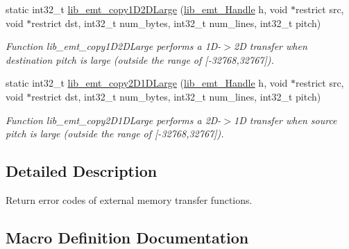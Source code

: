 \begin{DoxyCompactItemize}
static int32\+\_\+t \hyperlink{group__libarch__memtrans_ga1a987a6a5bddf31afc70ce6a0fbd17e1}{lib\+\_\+emt\+\_\+copy1\+D2\+D\+Large} (\hyperlink{group__libarch__memtrans_ga3ee110c7c5d95cfe386b113d2d078ec3}{lib\+\_\+emt\+\_\+\+Handle} h, void $\ast$restrict src, void $\ast$restrict dst, int32\+\_\+t num\+\_\+bytes, int32\+\_\+t num\+\_\+lines, int32\+\_\+t pitch)
\begin{DoxyCompactList}\small\item\em Function lib\+\_\+emt\+\_\+copy1\+D2\+D\+Large performs a 1\+D-\/$>$2\+D transfer when destination pitch is large (outside the range of \mbox{[}-\/32768,32767\mbox{]}). \end{DoxyCompactList}\item 
static int32\+\_\+t \hyperlink{group__libarch__memtrans_gab1b291a6ce214301ed50b5731590e29a}{lib\+\_\+emt\+\_\+copy2\+D1\+D\+Large} (\hyperlink{group__libarch__memtrans_ga3ee110c7c5d95cfe386b113d2d078ec3}{lib\+\_\+emt\+\_\+\+Handle} h, void $\ast$restrict src, void $\ast$restrict dst, int32\+\_\+t num\+\_\+bytes, int32\+\_\+t num\+\_\+lines, int32\+\_\+t pitch)
\begin{DoxyCompactList}\small\item\em Function lib\+\_\+emt\+\_\+copy2\+D1\+D\+Large performs a 2\+D-\/$>$1\+D transfer when source pitch is large (outside the range of \mbox{[}-\/32768,32767\mbox{]}). \end{DoxyCompactList}\end{DoxyCompactItemize}


\subsection{Detailed Description}
Return error codes of external memory transfer functions. 



\subsection{Macro Definition Documentation}
\hypertarget{group__libarch__memtrans_ga5262fd9542b2a9beb4f9b6a7c1215a95}{}

